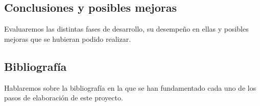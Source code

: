 \subsection{Conclusiones y posibles mejoras}

Evaluaremos las distintas fases de desarrollo, su desempeño en ellas y posibles mejoras que se hubieran podido realizar.

\subsection{Bibliografía}

Hablaremos sobre la bibliografía en la que se han fundamentado cada uno de los pasos de elaboración de este proyecto.